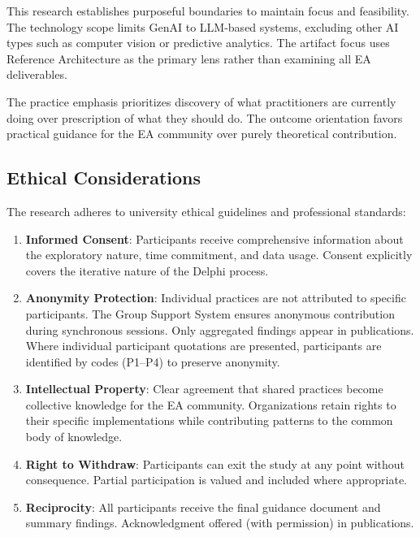 This research establishes purposeful boundaries to maintain focus and
feasibility. The technology scope limits GenAI to LLM-based systems, excluding
other AI types such as computer vision or predictive analytics. The artifact
focus uses Reference Architecture as the primary lens rather than examining all
EA deliverables.

The practice emphasis prioritizes discovery of what practitioners are currently
doing over prescription of what they should do. The outcome orientation favors
practical guidance for the EA community over purely theoretical contribution.

\subsection{Ethical Considerations}

The research adheres to university ethical guidelines and professional
standards:

\begin{enumerate}
    \item \textbf{Informed Consent}: Participants receive comprehensive information about the exploratory nature, time commitment, and data usage. Consent explicitly covers the iterative nature of the Delphi process.

    \item \textbf{Anonymity Protection}: Individual practices are not attributed to specific participants. The Group Support System ensures anonymous contribution during synchronous sessions. Only aggregated findings appear in publications. Where individual participant quotations are presented, participants are identified by codes (P1--P4) to preserve anonymity.

    \item \textbf{Intellectual Property}: Clear agreement that shared practices become collective knowledge for the EA community. Organizations retain rights to their specific implementations while contributing patterns to the common body of knowledge.

    \item \textbf{Right to Withdraw}: Participants can exit the study at any point without consequence. Partial participation is valued and included where appropriate.

    \item \textbf{Reciprocity}: All participants receive the final guidance document and summary findings. Acknowledgment offered (with permission) in publications.
\end{enumerate}

